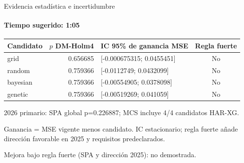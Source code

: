 \documentclass[aspectratio=169,10pt]{beamer}
\begin{document}
\begin{frame}{Evidencia estadística e incertidumbre}
\framesubtitle{Tiempo sugerido: 1:05}
\small\setlength{\tabcolsep}{5pt}\begin{tabular}{lrlc}\toprule Candidato & $p$ DM-Holm4 & IC 95\% de ganancia MSE & Regla fuerte\\\midrule
grid & 0.656685 & [-0.000675315; 0.0455451] & No\\
random & 0.759366 & [-0.0112749; 0.0432099] & No\\
bayesian & 0.759366 & [-0.00554905; 0.0378098] & No\\
genetic & 0.759366 & [-0.00519269; 0.041059] & No\\
\bottomrule\end{tabular}\par\medskip\small 2026 primario: SPA global p=0.226887; MCS incluye 4/4 candidatos HAR-XG.\par\smallskip\footnotesize Ganancia = MSE vigente menos candidato. IC estacionario; regla fuerte añade dirección favorable en 2025 y requisitos predeclarados.\par\medskip\small Mejora bajo regla fuerte (SPA y dirección 2025): no demostrada.
\end{frame}
\end{document}
